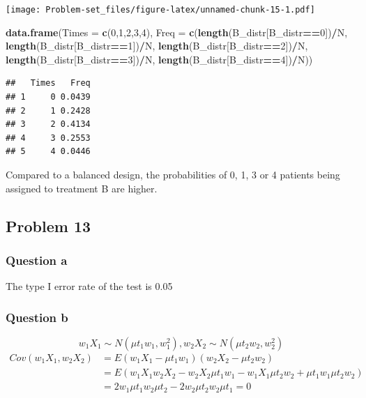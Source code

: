 \documentclass[]{article}
\newenvironment{Shaded}{\begin{snugshade}}{\end{snugshade}}
\newcommand{\DataTypeTok}[1]{\textcolor[rgb]{0.13,0.29,0.53}{#1}}
\newcommand{\DecValTok}[1]{\textcolor[rgb]{0.00,0.00,0.81}{#1}}
\newcommand{\KeywordTok}[1]{\textcolor[rgb]{0.13,0.29,0.53}{\textbf{#1}}}
\newcommand{\NormalTok}[1]{#1}
\newcommand{\OperatorTok}[1]{\textcolor[rgb]{0.81,0.36,0.00}{\textbf{#1}}}
\begin{document}
\texttt{[image: Problem-set\_files/figure-latex/unnamed-chunk-15-1.pdf]}

\begin{Shaded}
\begin{Highlighting}[]
\KeywordTok{data.frame}\NormalTok{(}\DataTypeTok{Times =} \KeywordTok{c}\NormalTok{(}\DecValTok{0}\NormalTok{,}\DecValTok{1}\NormalTok{,}\DecValTok{2}\NormalTok{,}\DecValTok{3}\NormalTok{,}\DecValTok{4}\NormalTok{), }\DataTypeTok{Freq =} \KeywordTok{c}\NormalTok{(}\KeywordTok{length}\NormalTok{(B_distr[B_distr}\OperatorTok{==}\DecValTok{0}\NormalTok{])}\OperatorTok{/}\NormalTok{N, }\KeywordTok{length}\NormalTok{(B_distr[B_distr}\OperatorTok{==}\DecValTok{1}\NormalTok{])}\OperatorTok{/}\NormalTok{N, }\KeywordTok{length}\NormalTok{(B_distr[B_distr}\OperatorTok{==}\DecValTok{2}\NormalTok{])}\OperatorTok{/}\NormalTok{N, }\KeywordTok{length}\NormalTok{(B_distr[B_distr}\OperatorTok{==}\DecValTok{3}\NormalTok{])}\OperatorTok{/}\NormalTok{N, }\KeywordTok{length}\NormalTok{(B_distr[B_distr}\OperatorTok{==}\DecValTok{4}\NormalTok{])}\OperatorTok{/}\NormalTok{N))}
\end{Highlighting}
\end{Shaded}

\begin{verbatim}
##   Times   Freq
## 1     0 0.0439
## 2     1 0.2428
## 3     2 0.4134
## 4     3 0.2553
## 5     4 0.0446
\end{verbatim}

Compared to a balanced design, the probabilities of 0, 1, 3 or 4
patients being assigned to treatment B are higher.

\hypertarget{problem-13}{%
\subsection{Problem 13}\label{problem-13}}

\hypertarget{question-a-8}{%
\subsubsection{Question a}\label{question-a-8}}

The type I error rate of the test is 0.05

\hypertarget{question-b-7}{%
\subsubsection{Question b}\label{question-b-7}}

\[w_1X_1\sim N(\mu t_1w_1, w_1^2), w_2X_2\sim N(\mu t_2w_2, w_2^2)\]
\[\begin{split}
Cov(w_1X_1, w_2X_2)&=E(w_1X_1-\mu t_1w_1)(w_2X_2-\mu t_2w_2)\\
&=E(w_1X_1w_2X_2-w_2X_2\mu t_1w_1-w_1X_1\mu t_2w_2+\mu t_1w_1\mu t_2w_2)\\
&=2w_1\mu t_1w_2\mu t_2-2w_2\mu t_2w_2\mu t_1=0
\end{split}\]
\end{document}

